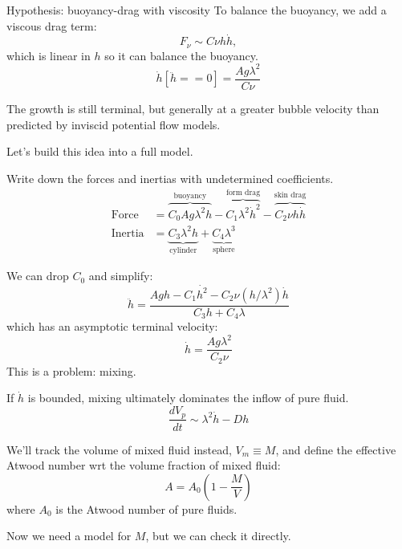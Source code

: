\documentclass[12pt]{beamer}
\begin{document}
\begin{frame}{Hypothesis: buoyancy-drag with viscosity}
To balance the buoyancy, we add a viscous drag term:
\begin{equation*}
F_\nu \sim C \nu h \dot{h},
\end{equation*}
which is linear in $h$ so it can balance the buoyancy.
\begin{equation*}
\dot{h}\left[\ddot{h} == 0\right] = \frac{A g \lambda^2}{C \nu}
\end{equation*}
\pause

The growth is still terminal, but generally at a greater bubble velocity than predicted by inviscid potential flow models.
\vspace{20pt} \pause
\begin{exampleblock}{}
Let's build this idea into a full model.
\end{exampleblock}
\end{frame}

\begin{frame}
Write down the forces and inertias with undetermined coefficients.
\begin{align*}
\text{Force} &= \overbrace{C_0 A g \lambda^2 h}^{\text{buoyancy}} - \overbrace{C_1 \lambda^2 \dot{h}^2}^{\text{form drag}} - \overbrace{C_2 \nu h \dot{h}}^{\text{skin drag}} \\
\text{Inertia} &= \underbrace{C_3 \lambda^2 h}_{\text{cylinder}} + \underbrace{C_4 \lambda^3}_{\text{sphere}}
\end{align*}\pause

We can drop $C_0$ and simplify:
\begin{equation*}
\ddot{h} = \frac{A g h - C_1 \dot{h^2} - C_2 \nu (h/\lambda^2) \dot{h}}{C_3 h + C_4 \lambda}
\end{equation*}
which has an asymptotic terminal velocity:
\begin{equation*}
\dot{h} = \frac{A g \lambda^2}{C_2 \nu}
\end{equation*}\pause
This is a problem: mixing.
\end{frame}

\begin{frame}
If $\dot{h}$ is bounded, mixing ultimately dominates the inflow of pure fluid.
\begin{equation*}
\frac{d V_p}{dt} \sim \lambda^2 \dot{h} - D h 
\end{equation*}
\pause

We'll track the volume of mixed fluid instead, $V_m \equiv M$, and define the effective Atwood number wrt the volume fraction of mixed fluid:
\begin{equation*}
A = A_0 \left(1 - \frac{M}{V}\right)
\end{equation*}
where $A_0$ is the Atwood number of pure fluids.
\vspace{20pt} \pause

Now we need a model for $M$, but we can check it directly.
\end{frame}
\end{document}
